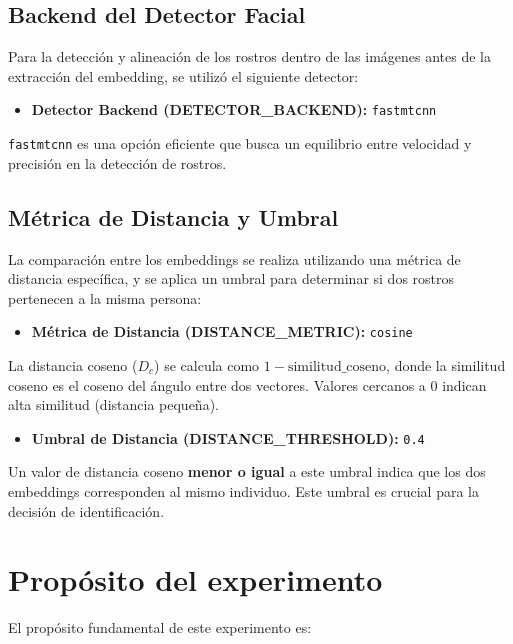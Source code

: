 \subsection{Backend del Detector Facial}
Para la detección y alineación de los rostros dentro de las imágenes antes de la extracción del embedding, se utilizó el siguiente detector:
\begin{itemize}
	\item \textbf{Detector Backend (DETECTOR\_BACKEND):} \texttt{fastmtcnn}
\end{itemize}
\texttt{fastmtcnn} es una opción eficiente que busca un equilibrio entre velocidad y precisión en la detección de rostros.

\subsection{Métrica de Distancia y Umbral}
La comparación entre los embeddings se realiza utilizando una métrica de distancia específica, y se aplica un umbral para determinar si dos rostros pertenecen a la misma persona:
\begin{itemize}
	\item \textbf{Métrica de Distancia (DISTANCE\_METRIC):} \texttt{cosine}
\end{itemize}
La distancia coseno ($D_c$) se calcula como $1 - \text{similitud\_coseno}$, donde la similitud coseno es el coseno del ángulo entre dos vectores. Valores cercanos a 0 indican alta similitud (distancia pequeña).
\begin{itemize}
	\item \textbf{Umbral de Distancia (DISTANCE\_THRESHOLD):} \texttt{0.4}
\end{itemize}
Un valor de distancia coseno \textbf{menor o igual} a este umbral indica que los dos embeddings corresponden al mismo individuo. Este umbral es crucial para la decisión de identificación.


\section{Propósito del experimento}

El propósito fundamental de este experimento es:

